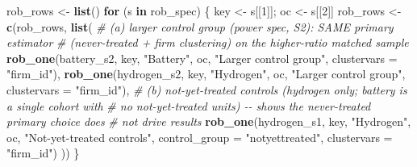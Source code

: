 \documentclass[
]{article}
\newenvironment{Shaded}{\begin{snugshade}}{\end{snugshade}}
\newcommand{\AttributeTok}[1]{\textcolor[rgb]{0.13,0.29,0.53}{#1}}
\newcommand{\CommentTok}[1]{\textcolor[rgb]{0.56,0.35,0.01}{\textit{#1}}}
\newcommand{\ControlFlowTok}[1]{\textcolor[rgb]{0.13,0.29,0.53}{\textbf{#1}}}
\newcommand{\DecValTok}[1]{\textcolor[rgb]{0.00,0.00,0.81}{#1}}
\newcommand{\FunctionTok}[1]{\textcolor[rgb]{0.13,0.29,0.53}{\textbf{#1}}}
\newcommand{\NormalTok}[1]{#1}
\newcommand{\OtherTok}[1]{\textcolor[rgb]{0.56,0.35,0.01}{#1}}
\newcommand{\StringTok}[1]{\textcolor[rgb]{0.31,0.60,0.02}{#1}}
\begin{document}
\begin{Shaded}
\begin{Highlighting}[]
\NormalTok{rob\_rows }\OtherTok{\textless{}{-}} \FunctionTok{list}\NormalTok{()}
\ControlFlowTok{for}\NormalTok{ (s }\ControlFlowTok{in}\NormalTok{ rob\_spec) \{}
\NormalTok{  key }\OtherTok{\textless{}{-}}\NormalTok{ s[[}\DecValTok{1}\NormalTok{]]; oc }\OtherTok{\textless{}{-}}\NormalTok{ s[[}\DecValTok{2}\NormalTok{]]}
\NormalTok{  rob\_rows }\OtherTok{\textless{}{-}} \FunctionTok{c}\NormalTok{(rob\_rows, }\FunctionTok{list}\NormalTok{(}
    \CommentTok{\# (a) larger control group (power spec, S2): SAME primary estimator}
    \CommentTok{\#     (never{-}treated + firm clustering) on the higher{-}ratio matched sample}
    \FunctionTok{rob\_one}\NormalTok{(battery\_s2,  key, }\StringTok{"Battery"}\NormalTok{,  oc, }\StringTok{"Larger control group"}\NormalTok{, }\AttributeTok{clustervars =} \StringTok{"firm\_id"}\NormalTok{),}
    \FunctionTok{rob\_one}\NormalTok{(hydrogen\_s2, key, }\StringTok{"Hydrogen"}\NormalTok{, oc, }\StringTok{"Larger control group"}\NormalTok{, }\AttributeTok{clustervars =} \StringTok{"firm\_id"}\NormalTok{),}
    \CommentTok{\# (b) not{-}yet{-}treated controls (hydrogen only; battery is a single cohort with}
    \CommentTok{\#     no not{-}yet{-}treated units) {-}{-} shows the never{-}treated primary choice does}
    \CommentTok{\#     not drive results}
    \FunctionTok{rob\_one}\NormalTok{(hydrogen\_s1, key, }\StringTok{"Hydrogen"}\NormalTok{, oc, }\StringTok{"Not{-}yet{-}treated controls"}\NormalTok{,}
            \AttributeTok{control\_group =} \StringTok{"notyettreated"}\NormalTok{, }\AttributeTok{clustervars =} \StringTok{"firm\_id"}\NormalTok{)}
\NormalTok{  ))}
\NormalTok{\}}
\end{Highlighting}
\end{Shaded}
\end{document}
